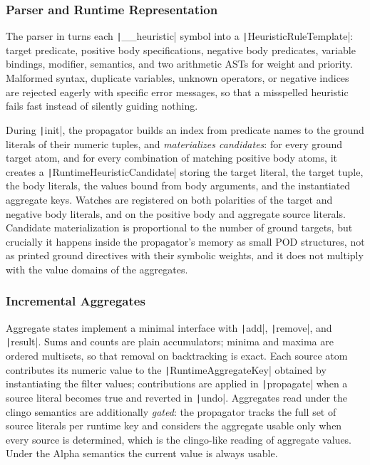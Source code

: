 \subsubsection{Parser and Runtime Representation}

The parser in  turns each \texttt|__heuristic| symbol into a \texttt|HeuristicRuleTemplate|: target predicate, positive body specifications, negative body predicates, variable bindings, modifier, semantics, and two arithmetic ASTs for weight and priority. Malformed syntax, duplicate variables, unknown operators, or negative indices are rejected eagerly with specific error messages, so that a misspelled heuristic fails fast instead of silently guiding nothing.

During \texttt|init|, the propagator builds an index from predicate names to the ground literals of their numeric tuples, and \emph{materializes candidates}: for every ground target atom, and for every combination of matching positive body atoms, it creates a \texttt|RuntimeHeuristicCandidate| storing the target literal, the target tuple, the body literals, the values bound from body arguments, and the instantiated aggregate keys. Watches are registered on both polarities of the target and negative body literals, and on the positive body and aggregate source literals. Candidate materialization is proportional to the number of ground targets, but crucially it happens inside the propagator's memory as small POD structures, not as printed ground directives with their symbolic weights, and it does not multiply with the value domains of the aggregates.

\subsubsection{Incremental Aggregates}

Aggregate states implement a minimal interface with \texttt|add|, \texttt|remove|, and \texttt|result|. Sums and counts are plain accumulators; minima and maxima are ordered multisets, so that removal on backtracking is exact. Each source atom contributes its numeric value to the \texttt|RuntimeAggregateKey| obtained by instantiating the filter values; contributions are applied in \texttt|propagate| when a source literal becomes true and reverted in \texttt|undo|. Aggregates read under the clingo semantics are additionally \emph{gated}: the propagator tracks the full set of source literals per runtime key and considers the aggregate usable only when every source is determined, which is the clingo-like reading of aggregate values. Under the Alpha semantics the current value is always usable.

